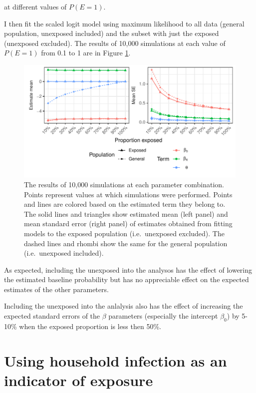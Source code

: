 \documentclass[]{article}
\begin{document}
at different values of \(P(E=1)\).

I then fit the scaled logit model using maximum likelihood to all data (general population, unexposed included) and the subset with just the exposed (unexposed excluded). The results of 10,000 simulations at each value of \(P(E=1)\) from 0.1 to 1 are in Figure \ref{fig:plot2}.



\begin{figure}

{\centering \includegraphics{sim-plot/plot2} 

}

\caption{The results of 10,000 simulations at each parameter combination. Points represent values at which simulations were performed. Points and lines are colored based on the estimated term they belong to. The solid lines and triangles show estimated mean (left panel) and mean standard error (right panel) of estimates obtained from fitting models to the exposed population (i.e.~unexposed excluded). The dashed lines and rhombi show the same for the general population (i.e.~unexposed included).}\label{fig:plot2}
\end{figure}

As expected, including the unexposed into the analysos has the effect of lowering the estimated baseline probability but has no appreciable effect on the expected estimates of the other parameters.

Including the unexposed into the anlalysis also has the effect of increasing the expected standard errors of the \(\beta\) parameters (especially the intercept \(\beta_0\)) by 5-10\% when the exposed proportion is less then 50\%.

\hypertarget{using-household-infection-as-an-indicator-of-exposure}{%
\section{Using household infection as an indicator of exposure}\label{using-household-infection-as-an-indicator-of-exposure}}
\end{document}
